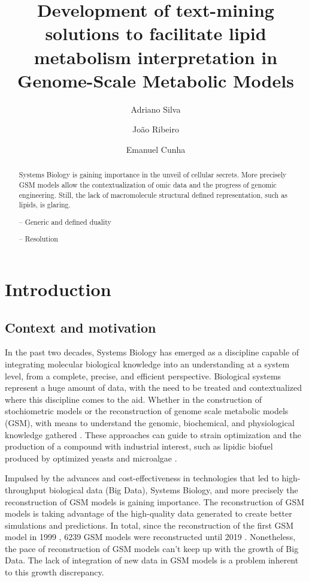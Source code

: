 \documentclass{llncs}
\begin{document}
\pagestyle{myheadings}
\title{Development of text-mining solutions to facilitate lipid metabolism interpretation in Genome-Scale Metabolic Models}

\author{Adriano Silva\and
João Ribeiro\and
Emanuel Cunha}

%
\maketitle              %
%
\begin{abstract}
Systems Biology is gaining importance in the unveil of cellular secrets. More precisely GSM models allow the contextualization of omic data and the progress of genomic engineering.
Still, the lack of macromolecule structural defined representation, such as lipids, is glaring.

-- Generic and defined duality

-- Resolution

\end{abstract}
%
%
%
\section{Introduction}
\subsection{Context and motivation}
In the past two decades, Systems Biology has emerged as a discipline capable of integrating molecular biological knowledge into an understanding at a system level, from a complete, precise, and efficient perspective.
Biological systems represent a huge amount of data, with the need to be treated and contextualized where this discipline comes to the aid.  
Whether in the construction of stochiometric models or the reconstruction of genome scale metabolic models (GSM), with means to understand the genomic, biochemical, and physiological knowledge gathered \cite{Zou2018,Tavassoly2018}. 
These approaches can guide to strain optimization and the production of a compound with industrial interest, such as lipidic biofuel produced by optimized yeasts and microalgae \cite{Sawangkeaw2013}.

Impulsed by the advances and cost-effectiveness in technologies that led to high-throughput biological data (Big Data), Systems Biology, and more precisely the reconstruction of GSM models is gaining importance.
The reconstruction of GSM models is taking advantage of the high-quality data generated to create better simulations and predictions. 
In total, since the reconstruction of the first GSM model in 1999 \cite{Edwards1999}, 6239 GSM models were reconstructed until 2019 \cite{Gu2019}. 
Nonetheless, the pace of reconstruction of GSM models can't keep up with the growth of Big Data. The lack of integration of new data in GSM models is a problem inherent to this growth discrepancy.
\end{document}

